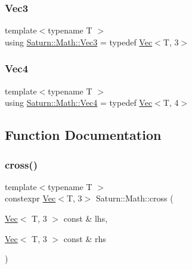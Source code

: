 \mbox{\label{namespace_saturn_1_1_math_af4a7a893730c64ac02b620f648cc5406}} 
\subsubsection{\texorpdfstring{Vec3}{Vec3}}
{\footnotesize\ttfamily template$<$typename T $>$ \\
using \mbox{\hyperlink{namespace_saturn_1_1_math_af4a7a893730c64ac02b620f648cc5406}{Saturn\+::\+Math\+::\+Vec3}} = typedef \mbox{\hyperlink{class_saturn_1_1_math_1_1_vec}{Vec}}$<$T, 3$>$}

\mbox{\label{namespace_saturn_1_1_math_a311b3d690ef397050af7963caa08d1bd}} 
\subsubsection{\texorpdfstring{Vec4}{Vec4}}
{\footnotesize\ttfamily template$<$typename T $>$ \\
using \mbox{\hyperlink{namespace_saturn_1_1_math_a311b3d690ef397050af7963caa08d1bd}{Saturn\+::\+Math\+::\+Vec4}} = typedef \mbox{\hyperlink{class_saturn_1_1_math_1_1_vec}{Vec}}$<$T, 4$>$}



\subsection{Function Documentation}
\mbox{\label{namespace_saturn_1_1_math_a0e0f2292e1b7ee36fac6f5839c3d3c7d}} 
\subsubsection{\texorpdfstring{cross()}{cross()}}
{\footnotesize\ttfamily template$<$typename T $>$ \\
constexpr \mbox{\hyperlink{class_saturn_1_1_math_1_1_vec}{Vec}}$<$T, 3$>$ Saturn\+::\+Math\+::cross (\begin{DoxyParamCaption}\item[{\mbox{\hyperlink{class_saturn_1_1_math_1_1_vec}{Vec}}$<$ T, 3 $>$ const \&}]{lhs,  }\item[{\mbox{\hyperlink{class_saturn_1_1_math_1_1_vec}{Vec}}$<$ T, 3 $>$ const \&}]{rhs }\end{DoxyParamCaption})}

